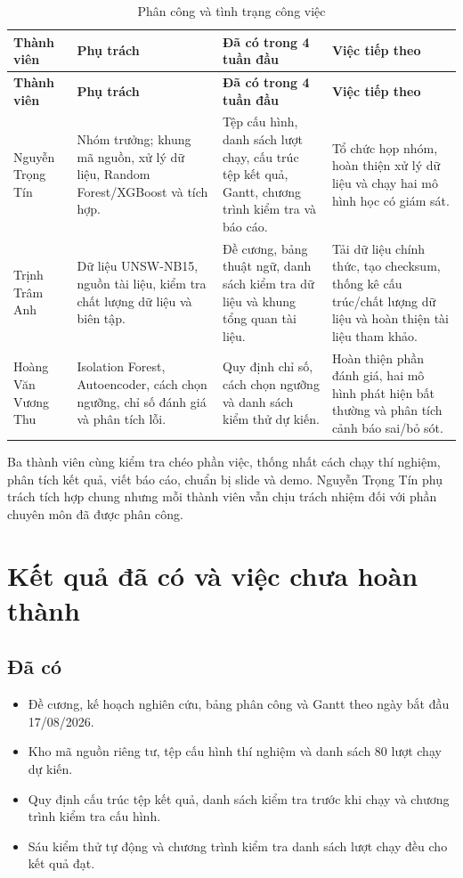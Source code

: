 \documentclass[12pt,a4paper,oneside]{article}
\begin{document}
\small
\renewcommand{\arraystretch}{1.35}
\noindent\begin{longtable}{L{3.0cm}L{4.2cm}L{4.3cm}L{3.0cm}}
\caption{Phân công và tình trạng công việc}\label{tab:members}\\
\toprule\textbf{Thành viên} & \textbf{Phụ trách} & \textbf{Đã có trong 4 tuần đầu} & \textbf{Việc tiếp theo}\\
\midrule\endfirsthead
\toprule\textbf{Thành viên} & \textbf{Phụ trách} & \textbf{Đã có trong 4 tuần đầu} & \textbf{Việc tiếp theo}\\
\midrule\endhead\bottomrule\endfoot
Nguyễn Trọng Tín & Nhóm trưởng; khung mã nguồn, xử lý dữ liệu, Random Forest/XGBoost và tích hợp. & Tệp cấu hình, danh sách lượt chạy, cấu trúc tệp kết quả, Gantt, chương trình kiểm tra và báo cáo. & Tổ chức họp nhóm, hoàn thiện xử lý dữ liệu và chạy hai mô hình học có giám sát.\\
Trịnh Trâm Anh & Dữ liệu UNSW-NB15, nguồn tài liệu, kiểm tra chất lượng dữ liệu và biên tập. & Đề cương, bảng thuật ngữ, danh sách kiểm tra dữ liệu và khung tổng quan tài liệu. & Tải dữ liệu chính thức, tạo checksum, thống kê cấu trúc/chất lượng dữ liệu và hoàn thiện tài liệu tham khảo.\\
Hoàng Văn Vương Thu & Isolation Forest, Autoencoder, cách chọn ngưỡng, chỉ số đánh giá và phân tích lỗi. & Quy định chỉ số, cách chọn ngưỡng và danh sách kiểm thử dự kiến. & Hoàn thiện phần đánh giá, hai mô hình phát hiện bất thường và phân tích cảnh báo sai/bỏ sót.\\
\end{longtable}
\normalsize

Ba thành viên cùng kiểm tra chéo phần việc, thống nhất cách chạy thí nghiệm, phân tích kết quả, viết báo cáo, chuẩn bị slide và demo. Nguyễn Trọng Tín phụ trách tích hợp chung nhưng mỗi thành viên vẫn chịu trách nhiệm đối với phần chuyên môn đã được phân công.

\section{Kết quả đã có và việc chưa hoàn thành}
\subsection{Đã có}
\begin{itemize}[leftmargin=1.05cm,itemsep=0.2em]
\item Đề cương, kế hoạch nghiên cứu, bảng phân công và Gantt theo ngày bắt đầu 17/08/2026.
\item Kho mã nguồn riêng tư, tệp cấu hình thí nghiệm và danh sách 80 lượt chạy dự kiến.
\item Quy định cấu trúc tệp kết quả, danh sách kiểm tra trước khi chạy và chương trình kiểm tra cấu hình.
\item Sáu kiểm thử tự động và chương trình kiểm tra danh sách lượt chạy đều cho kết quả đạt.
\end{itemize}
\end{document}

